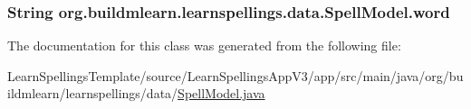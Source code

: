 \subsubsection[{\texorpdfstring{word}{word}}]{\setlength{\rightskip}{0pt plus 5cm}String org.\+buildmlearn.\+learnspellings.\+data.\+Spell\+Model.\+word\hspace{0.3cm}{\ttfamily [private]}}\hypertarget{classorg_1_1buildmlearn_1_1learnspellings_1_1data_1_1SpellModel_a1de777e680f4faa84afb63255ebcbe98}{}\label{classorg_1_1buildmlearn_1_1learnspellings_1_1data_1_1SpellModel_a1de777e680f4faa84afb63255ebcbe98}


The documentation for this class was generated from the following file\+:\begin{DoxyCompactItemize}
\item 
Learn\+Spellings\+Template/source/\+Learn\+Spellings\+App\+V3/app/src/main/java/org/buildmlearn/learnspellings/data/\hyperlink{SpellModel_8java}{Spell\+Model.\+java}\end{DoxyCompactItemize}
